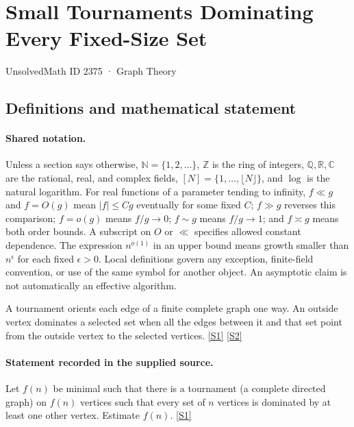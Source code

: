 \documentclass[11pt,a4paper]{article}
\newcommand{\N}{\mathbb{N}}
\newcommand{\Z}{\mathbb{Z}}
\newcommand{\Q}{\mathbb{Q}}
\newcommand{\R}{\mathbb{R}}
\newcommand{\C}{\mathbb{C}}
\newcommand{\sref}[2]{\hyperlink{source:#1:#2}{[S#2]}}
\begin{document}

\setcounter{section}{2374}

\section{Small Tournaments Dominating Every Fixed-Size Set}\label{2375}

{\small\sffamily UnsolvedMath ID 2375 · Graph Theory}

\subsection{Definitions and mathematical statement}

\paragraph{Shared notation.}Unless a section says otherwise, $\N=\{1,2,\ldots\}$,
$\Z$ is the ring of integers, $\Q,\R,\C$ are the rational, real, and complex
fields, $[N]=\{1,\ldots,\lfloor N\rfloor\}$, and $\log$ is the natural
logarithm. For real functions of a parameter tending to infinity,
$f\ll g$ and $f=O(g)$ mean $|f|\leq Cg$ eventually for some fixed $C$;
$f\gg g$ reverses this comparison; $f=o(g)$ means $f/g\to0$;
$f\sim g$ means $f/g\to1$; and $f\asymp g$ means both order bounds.
A subscript on $O$ or $\ll$ specifies allowed constant dependence.
The expression $n^{o(1)}$ in an upper bound means growth smaller than
$n^\epsilon$ for each fixed $\epsilon>0$. Local definitions govern any
exception, finite-field convention, or use of the same symbol for another
object. An asymptotic claim is not automatically an effective algorithm.



A tournament orients each edge of a finite complete graph one way. An outside vertex dominates a selected set when all the edges between it and that set point from the outside vertex to the selected vertices. \sref{2375}{1} \sref{2375}{2}

\paragraph{Statement recorded in the supplied source.}
Let $f(n)$ be minimal such that there is a tournament (a complete directed graph) on $f(n)$ vertices such that every set of $n$ vertices is dominated by at least one other vertex. Estimate $f(n)$. \sref{2375}{1}
\end{document}
